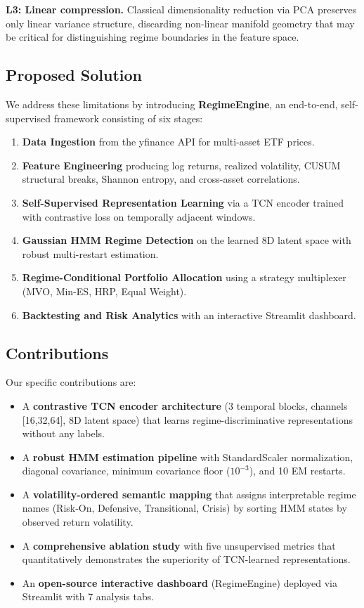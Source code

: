 \documentclass[conference, twocolumn]{IEEEtran}
\begin{document}
\textbf{L3: Linear compression.} Classical dimensionality reduction via PCA preserves only linear variance structure, discarding non-linear manifold geometry that may be critical for distinguishing regime boundaries in the feature space.

\subsection{Proposed Solution}

We address these limitations by introducing \textbf{RegimeEngine}, an end-to-end, self-supervised framework consisting of six stages:

\begin{enumerate}
    \item \textbf{Data Ingestion} from the yfinance API for multi-asset ETF prices.
    \item \textbf{Feature Engineering} producing log returns, realized volatility, CUSUM structural breaks, Shannon entropy, and cross-asset correlations.
    \item \textbf{Self-Supervised Representation Learning} via a TCN encoder trained with contrastive loss on temporally adjacent windows.
    \item \textbf{Gaussian HMM Regime Detection} on the learned 8D latent space with robust multi-restart estimation.
    \item \textbf{Regime-Conditional Portfolio Allocation} using a strategy multiplexer (MVO, Min-ES, HRP, Equal Weight).
    \item \textbf{Backtesting and Risk Analytics} with an interactive Streamlit dashboard.
\end{enumerate}

\subsection{Contributions}

Our specific contributions are:
\begin{itemize}
    \item A \textbf{contrastive TCN encoder architecture} (3 temporal blocks, channels [16,32,64], 8D latent space) that learns regime-discriminative representations without any labels.
    \item A \textbf{robust HMM estimation pipeline} with StandardScaler normalization, diagonal covariance, minimum covariance floor ($10^{-3}$), and 10 EM restarts.
    \item A \textbf{volatility-ordered semantic mapping} that assigns interpretable regime names (Risk-On, Defensive, Transitional, Crisis) by sorting HMM states by observed return volatility.
    \item A \textbf{comprehensive ablation study} with five unsupervised metrics that quantitatively demonstrates the superiority of TCN-learned representations.
    \item An \textbf{open-source interactive dashboard} (RegimeEngine) deployed via Streamlit with 7 analysis tabs.
\end{itemize}
\end{document}
